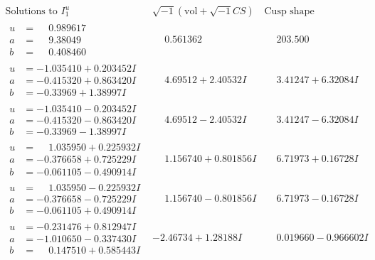 \documentclass[1p]{elsarticle_modified}
\theoremstyle{definition}
\newcommand{\I}{\sqrt{-1}}
\begin{document}
$$\begin{array}{c|c|c}  
\text{Solutions to }I^u_{1}& \I (\text{vol} + \sqrt{-1}CS) & \text{Cusp shape}\\
 \hline 
\begin{aligned}
u &= \phantom{-}0.989617\phantom{ +0.000000I} \\
a &= \phantom{-}9.38049\phantom{ +0.000000I} \\
b &= \phantom{-}0.408460\phantom{ +0.000000I}\end{aligned}
 & \phantom{-}0.561362\phantom{ +0.000000I} & \phantom{-}203.500\phantom{ +0.000000I} \\ \hline\begin{aligned}
u &= -1.035410 + 0.203452 I \\
a &= -0.415320 + 0.863420 I \\
b &= -0.33969 + 1.38997 I\end{aligned}
 & \phantom{-}4.69512 + 2.40532 I & \phantom{-}3.41247 + 6.32084 I \\ \hline\begin{aligned}
u &= -1.035410 - 0.203452 I \\
a &= -0.415320 - 0.863420 I \\
b &= -0.33969 - 1.38997 I\end{aligned}
 & \phantom{-}4.69512 - 2.40532 I & \phantom{-}3.41247 - 6.32084 I \\ \hline\begin{aligned}
u &= \phantom{-}1.035950 + 0.225932 I \\
a &= -0.376658 + 0.725229 I \\
b &= -0.061105 - 0.490914 I\end{aligned}
 & \phantom{-}1.156740 + 0.801856 I & \phantom{-}6.71973 + 0.16728 I \\ \hline\begin{aligned}
u &= \phantom{-}1.035950 - 0.225932 I \\
a &= -0.376658 - 0.725229 I \\
b &= -0.061105 + 0.490914 I\end{aligned}
 & \phantom{-}1.156740 - 0.801856 I & \phantom{-}6.71973 - 0.16728 I \\ \hline\begin{aligned}
u &= -0.231476 + 0.812947 I \\
a &= -1.010650 - 0.337430 I \\
b &= \phantom{-}0.147510 + 0.585443 I\end{aligned}
 & -2.46734 + 1.28188 I & \phantom{-}0.019660 - 0.966602 I \\ \hline\begin{aligned}

\end{aligned}
\end{array}$$
\end{document}

